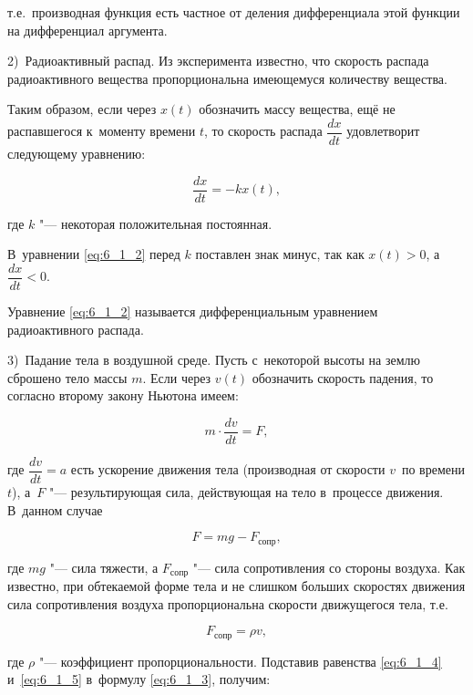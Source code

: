 \noindent
т.е.\ производная функция есть частное от деления дифференциала этой функции
на дифференциал аргумента.

2)~Радиоактивный распад. Из эксперимента известно, что скорость распада
радиоактивного вещества пропорциональна имеющемуся количеству вещества.

Таким образом, если через $x(t)$ обозначить массу вещества, ещё не распавшегося
к~моменту времени $t$, то скорость распада $\dfrac{dx}{dt}$
удовлетворит следующему уравнению:

\begin{equation}\label{eq:6_1_2}
\dfrac{dx}{dt} = - kx(t),
\end{equation}

\noindent
где $k$ "--- некоторая положительная постоянная.

В~уравнении \eqref{eq:6_1_2} перед $k$ поставлен знак минус, так как
$x(t) > 0$, а~$\dfrac{dx}{dt} < 0$.

Уравнение \eqref{eq:6_1_2} называется дифференциальным уравнением радиоактивного распада.

3)~Падание тела в воздушной среде. Пусть с~некоторой высоты на землю сброшено тело
массы $m$. Если через $v(t)$ обозначить скорость падения, то согласно второму закону
Ньютона имеем:

\begin{equation}\label{eq:6_1_3}
m \cdot \dfrac{dv}{dt} = F,
\end{equation}

\noindent
где $\dfrac{dv}{dt} = a$ есть ускорение движения тела (производная от скорости
$v$~по времени $t$), а~$F$ "--- результирующая сила, действующая на тело
в~процессе движения. В~данном случае

\begin{equation}\label{eq:6_1_4}
F = mg - F_{сопр},
\end{equation}

\noindent
где $mg$ "--- сила тяжести, а $F_{сопр}$ "--- сила сопротивления со стороны воздуха.
Как известно, при обтекаемой форме тела и не слишком больших скоростях движения
сила сопротивления воздуха пропорциональна скорости движущегося тела, т.е.\

\begin{equation}\label{eq:6_1_5}
F_{сопр} = \rho v,
\end{equation}

\noindent
где $\rho$ "--- коэффициент пропорциональности. Подставив равенства \eqref{eq:6_1_4}
и~\eqref{eq:6_1_5} в~формулу \eqref{eq:6_1_3}, получим:


